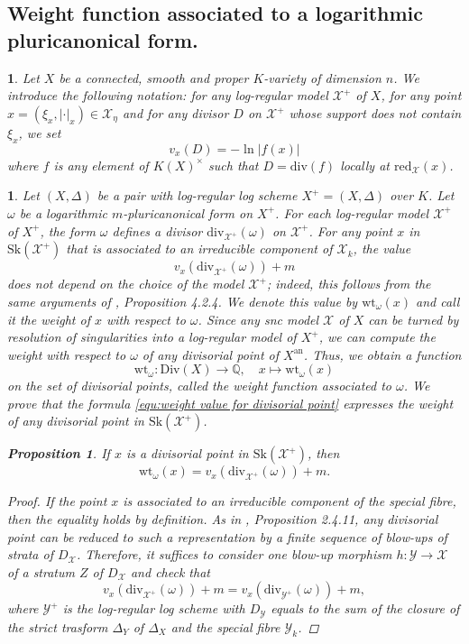 \documentclass{amsart}%
\numberwithin{equation}{subsection}
\theoremstyle{plain2}
\newtheorem{prop}[equation]{Proposition}
\theoremstyle{definition2}
\theoremstyle{stepstyle}
\theoremstyle{point}
\theoremstyle{subpoint}
\newtheorem{subpoint}[equation]{}%
\newcommand{\spa}[1]{\begin{subpoint}#1\end{subpoint}}           %
\newcommand{\Q}{\ensuremath{\mathbb{Q}}}
\newcommand{\cX}{\ensuremath{\mathscr{X}}}
\newcommand{\cY}{\ensuremath{\mathscr{Y}}}
\renewcommand{\cY}{\ensuremath{\mathscr{Y}}}
\newcommand{\redu}{\mathrm{red}}
\newcommand{\an}{\mathrm{an}}
\newcommand{\divisor}{\mathrm{div}}
\newcommand{\weight}{\mathrm{wt}}
\newcommand{\Sk}{\mathrm{Sk}}
\begin{document}
\subsection{Weight function associated to a logarithmic pluricanonical form.}
\spa{Let $X$ be a connected, smooth and proper $K$-variety of dimension $n$. We introduce the following notation: for any log-regular model $\cX^+$ of $X$, for any point $x = (\xi_x,|\cdot|_x) \in \widehat{\cX_{\eta}}$ and for any divisor $D$ on $\cX^+$ whose support does not contain $\xi_x$, we set $$v_x(D) = - \ln |f(x)|$$ where $f$ is any element of $K(X)^\times$ such that $D= \divisor(f)$ locally at $\redu_{\cX}(x)$.}

\spa{Let $(X,\Delta)$ be a pair with log-regular log scheme $X^+=(X,\Delta)$ over $K$. Let $\omega$ be a logarithmic $m$-pluricanonical form on $X^+$. For each log-regular model $\cX^+$ of $X^+$, the form $\omega$ defines a divisor $\divisor_{\cX^+}(\omega)$ on $\cX^+$. For any point $x$ in $\Sk(\cX^+)$ that is associated to an irreducible component of $\cX_k$, the value \begin{equation} \label{equ:weight value for divisorial point}
v_x(\divisor_{\cX^+}(\omega)) +m
\end{equation} does not depend on the choice of the model $\cX^+$; indeed, this follows from the same arguments of \cite{MustataNicaise}, Proposition 4.2.4. We denote this value by $\weight_{\omega}(x)$ and call it the weight of $x$ with respect to $\omega$. Since any snc model $\cX$ of $X$ can be turned by resolution of singularities into a log-regular model of $X^+$, we can compute the weight with respect to $\omega$ of any divisorial point of $X^\an$. Thus, we obtain a function $$\weight_{\omega}: \text{Div}(X) \rightarrow \Q, \quad x \mapsto \weight_{\omega}(x)$$ on the set of divisorial points, called the weight function associated to $\omega$. We prove that the formula \ref{equ:weight value for divisorial point} expresses the weight of any divisorial point in $\Sk(\cX^+)$.

\begin{prop} \label{prop weight function on log regular model}
If $x$ is a divisorial point in $\Sk(\cX^+)$, then $$\weight_{\omega}(x)=v_x(\divisor_{\cX^+}(\omega)) +m.$$
\end{prop}
\begin{proof}
If the point $x$ is associated to an irreducible component of the special fibre, then the equality holds by definition. As in \cite{MustataNicaise}, Proposition 2.4.11, any divisorial point can be reduced to such a representation by a finite sequence of blow-ups of strata of $D_\cX$. Therefore, it suffices to consider one blow-up morphism $h:\cY \rightarrow \cX$ of a stratum $Z$ of $D_\cX$ and check that $$v_x(\divisor_{\cX^+}(\omega)) +m=v_x(\divisor_{\cY^+}(\omega)) +m,$$ where $\cY^+$ is the log-regular log scheme with $D_\cY$ equals to the sum of the closure of the strict trasform $\Delta_Y$ of $\Delta_X$ and the special fibre $\cY_k$.


\end{proof}}
\end{document}
